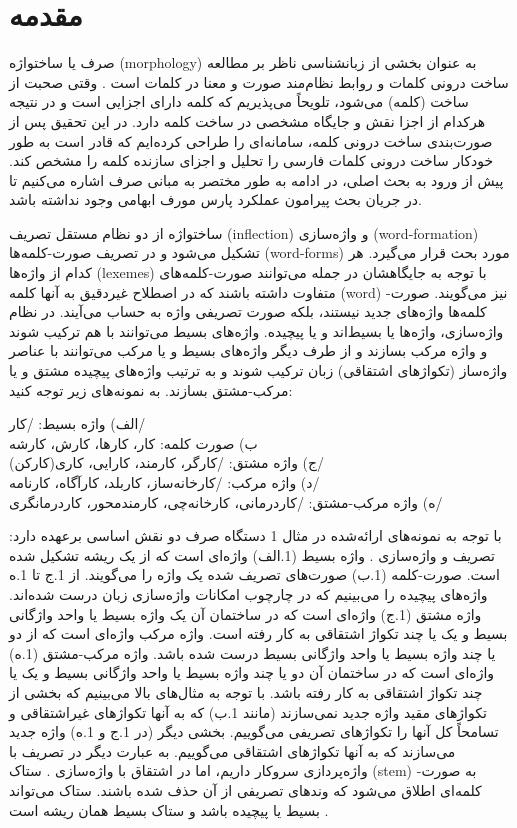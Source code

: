 \documentclass[12pt,onecolumn,a4paper]{article}
\begin{document}
    \section{مقدمه}
    صرف یا ساختواژه (morphology) به عنوان بخشی از زبان‏شناسی ناظر بر مطالعه ساخت درونی کلمات و روابط نظام‌مند صورت و معنا در کلمات است  . وقتی صحبت از ساخت (کلمه) می‌شود، تلویحاً می‌پذیریم که کلمه دارای اجزایی است و در نتیجه هرکدام از اجزا نقش و جایگاه مشخصی در ساخت کلمه دارد. در این تحقیق پس از صورت‌بندی ساخت درونی کلمه، سامانه‌ای را طراحی کرده‌ایم که قادر است به طور خودکار ساخت درونی کلمات فارسی را تحلیل و اجزای سازنده کلمه را مشخص کند. پیش از ورود به بحث اصلی، در ادامه به طور مختصر به مبانی صرف اشاره می‌کنیم تا در جریان بحث پیرامون عملکرد پارس مورف ابهامی وجود نداشته باشد.
    \par\noindent
    ساختواژه از دو نظام مستقل تصریف (inflection) و واژه‌سازی (word-formation) تشکیل می‌شود و در تصریف صورت-کلمه‌ها (word-forms) مورد بحث قرار می‌گیرد. هر کدام از واژه‌ها (lexemes) با توجه به جایگاهشان در جمله می‌توانند صورت-کلمه‌های متفاوت داشته باشند که در اصطلاح غیردقیق به آنها کلمه (word) نیز می‌گویند. صورت-کلمه‌ها واژه‌های جدید نیستند، بلکه صورت تصریفی واژه‌ به حساب می‌آیند. در نظام واژه‌سازی، واژه‌ها یا بسیط‌اند و یا پیچیده. واژه‌های بسیط می‌توانند با هم ترکیب شوند و واژه مرکب بسازند و از طرف دیگر واژه‌های بسیط و یا مرکب می‌توانند با عناصر واژه‌ساز (تکواژهای اشتقاقی) زبان ترکیب شوند و به ترتیب واژه‌های پیچیده مشتق و یا مرکب-مشتق بسازند. به نمونه‌های زیر توجه کنید:
    \par\noindent
    الف) واژه بسیط: /کار/ \\
    ب) صورت کلمه: کار، کارها، کارش، کارشه \\
    ج) واژه مشتق: /کارگر، کارمند، کارایی، کاری(کارکن)/ \\
    د) واژه مرکب: /کارخانه‌ساز، کاربلد، کارآگاه، کارنامه/ \\
    ه) واژه مرکب-مشتق: /کاردرمانی، کارخانه‌چی، کارمندمحور، کاردرمانگری/ \\
    \par\noindent
    با توجه به نمونه‌های ارائه‌شده در مثال 1 دستگاه صرف دو نقش اساسی برعهده دارد: تصریف و واژه‌‌سازی {\mfo\citep{Taba82}}. واژه بسیط (1.الف) واژه‌ای است که از یک ریشه تشکیل شده است. صورت-کلمه (1.ب) صورت‌های تصریف شده یک واژه را می‌گویند. از 1.ج تا 1.ه واژه‌های پیچیده را می‌بینیم که در چارچوب امکانات واژه‌سازی زبان درست شده‌اند. واژه مشتق (1.ج) واژه‌ای است که در ساختمان آن یک واژه بسیط یا واحد واژگانی بسیط و یک یا چند تکواژ اشتقاقی به کار رفته است. واژه مرکب واژه‌ای است که از دو یا چند واژه بسیط یا واحد واژگانی بسیط درست شده باشد. واژه مرکب-مشتق (1.ه) واژه‌ای است که در ساختمان آن دو یا چند واژه بسیط یا واحد واژگانی بسیط و یک یا چند تکواژ اشتقاقی به کار رفته باشد. با توجه به مثال‌های بالا می‌بینیم که بخشی از تکواژهای مقید واژه جدید نمی‌سازند (مانند 1.ب) که به آنها تکواژهای غیراشتقاقی و تسامحاً کل آنها را تکواژهای تصریفی می‌گوییم. بخشی دیگر (در 1.ج و 1.ه) واژه جدید می‌سازند که به آنها تکواژهای اشتقاقی می‌گوییم. به عبارت دیگر در تصریف با واژه‌پردازی سروکار داریم، اما در اشتقاق با واژه‌سازی {\mfo\citep{Taba76}}. ستاک (stem) به صورت-کلمه‌ای اطلاق می‌شود که وندهای تصریفی از آن حذف شده باشند. ستاک می‌تواند بسیط یا پیچیده باشد و ستاک بسیط همان ریشه است .
\end{document}
